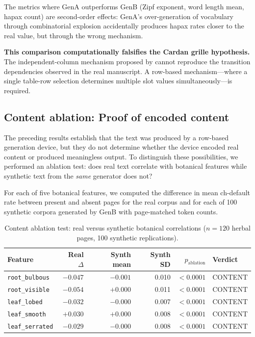 \documentclass[12pt]{article}
\begin{document}
The metrics where GenA outperforms GenB (Zipf exponent, word length mean, hapax count) are second-order effects: GenA's over-generation of vocabulary through combinatorial explosion accidentally produces hapax rates closer to the real value, but through the wrong mechanism.

\textbf{This comparison computationally falsifies the Cardan grille hypothesis.} The independent-column mechanism proposed by \citet{Rugg2004} cannot reproduce the transition dependencies observed in the real manuscript. A row-based mechanism---where a single table-row selection determines multiple slot values simultaneously---is required.

\subsection{Content ablation: Proof of encoded content}
\label{sec:ablation}

The preceding results establish that the text was produced by a row-based generation device, but they do not determine whether the device encoded real content or produced meaningless output. To distinguish these possibilities, we performed an ablation test: does real text correlate with botanical features while synthetic text from the \emph{same} generator does not?

For each of five botanical features, we computed the difference in mean ch-default rate between present and absent pages for the real corpus and for each of 100 synthetic corpora generated by GenB with page-matched token counts.

\begin{table}[ht]
\centering
\caption{Content ablation test: real versus synthetic botanical correlations ($n = 120$ herbal pages, 100 synthetic replications).}
\label{tab:ablation}
\begin{tabular}{lrrrrl}
\toprule
Feature & Real $\Delta$ & Synth mean & Synth SD & $p_{\text{ablation}}$ & Verdict \\
\midrule
\texttt{root\_bulbous}  & $-0.047$ & $-0.001$ & 0.010 & $< 0.0001$ & CONTENT \\
\texttt{root\_visible}  & $-0.054$ & $+0.000$ & 0.011 & $< 0.0001$ & CONTENT \\
\texttt{leaf\_lobed}    & $-0.032$ & $-0.000$ & 0.007 & $< 0.0001$ & CONTENT \\
\texttt{leaf\_smooth}   & $+0.030$ & $+0.000$ & 0.008 & $< 0.0001$ & CONTENT \\
\texttt{leaf\_serrated} & $-0.029$ & $-0.000$ & 0.008 & $< 0.0001$ & CONTENT \\
\bottomrule
\end{tabular}
\end{table}
\end{document}

